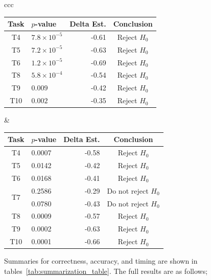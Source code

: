 \begin{table}[htpb]
\begin{tabular}{ccc}
    \begin{tabular}{clrc}
      \toprule
      Task & $p$-value            & Delta Est. & Conclusion\\\midrule
      T4   & $7.8 \times 10^{-5}$ & -0.61      & Reject $H_0$\\
      T5   & $7.2 \times 10^{-5}$ & -0.63      & Reject $H_0$\\
      T6   & $1.2 \times 10^{-5}$ & -0.69      & Reject $H_0$\\
      T8   & $5.8 \times 10^{-4}$ & -0.54      & Reject $H_0$\\
      T9   & $0.009$              & -0.42      & Reject $H_0$\\
      T10  & $0.002$              & -0.35      & Reject $H_0$\\
      \bottomrule
    \end{tabular}
    &
    \begin{tabular}{clrc}
      \toprule
      Task                 & $p$-value & Delta Est. & Conclusion\\\midrule
      T4                   & 0.0007    & -0.58      & Reject $H_0$\\
      T5                   & 0.0142    & -0.42      & Reject $H_0$\\
      T6                   & 0.0168    & -0.41      & Reject $H_0$\\
      \multirow{2}{*}{T7}  & 0.2586    & -0.29      & Do not reject $H_0$\\
                           & 0.0780    & -0.43      & Do not reject $H_0$\\
      T8                   & 0.0009    & -0.57      & Reject $H_0$\\
      T9                   & 0.0002    & -0.63      & Reject $H_0$\\
      T10                  & 0.0001    & -0.66      & Reject $H_0$\\
      \bottomrule
    \end{tabular}
  \end{tabular}
\end{table}

Summaries for correctness, accuracy, and timing are shown in
tables~\ref{tab:summarization_table}.
The full results are as follows;

